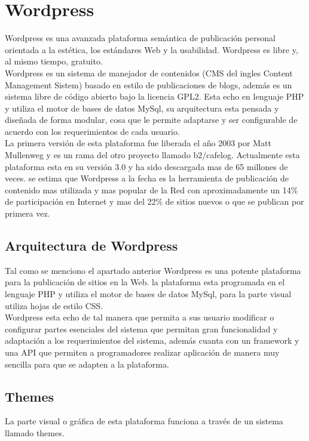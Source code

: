 \section{Wordpress}
Wordpress es una avanzada plataforma semántica de publicación personal orientada a la estética, los estándares Web y la usabilidad. Wordpress es libre y, al mismo tiempo, gratuito.\\
Wordpress es un sistema de manejador de contenidos (CMS del ingles Content Management Sistem) basado en estilo de publicaciones de blogs, además es un sistema libre de código abierto bajo la licencia GPL2. Esta echo en lenguaje PHP y utiliza el motor de bases de datos MySql, su arquitectura esta pensada y diseñada de forma modular, cosa que le permite adaptarse y ser configurable de acuerdo con los requerimientos de cada usuario.\\
La primera versión de esta plataforma fue liberada el año 2003 por Matt Mullenweg y es un rama del otro proyecto llamado b2/cafelog. Actualmente esta plataforma esta en su versión 3.0 y ha sido descargada mas de 65 millones de veces. se estima que Wordpress a la fecha es la herramienta de publicación de contenido mas utilizada y mas popular de la Red con aproximadamente un 14\% de participación en Internet y mas del 22\% de sitios nuevos o que se publican por primera vez.

\subsection{Arquitectura de Wordpress}
Tal como se menciono el apartado anterior Wordpress es una potente plataforma para la publicación de sitios en la Web. la plataforma esta programada en el lenguaje PHP y utiliza el motor de bases de datos MySql, para la parte visual utiliza hojas de estilo CSS.\\
Wordpress esta echo de tal manera que permita a sus usuario modificar o configurar partes esenciales del sistema que permitan gran funcionalidad y adaptación a los requerimientos del sistema, además cuanta con un framework y una API que permiten a programadores realizar aplicación de manera muy sencilla para que se adapten a la plataforma.

\subsection{Themes}
La parte visual o gráfica de esta plataforma funciona a través de un sistema llamado themes.\\

